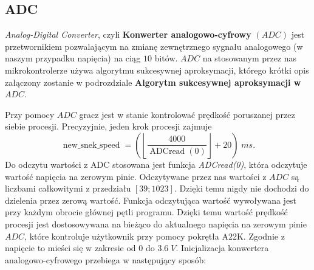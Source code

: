 \documentclass[a4paper,12pt,twoside]{article}
\theoremstyle{plain}
\theoremstyle{definition}
\theoremstyle{remark}
\begin{document}
\subsection{ADC}
\textit{Analog-Digital Converter}, czyli
\textbf{Konwerter analogowo-cyfrowy} $(ADC)$ jest przetwornikiem pozwalającym na zmianę zewnętrznego sygnału analogowego (w naszym przypadku napięcia) na ciąg $10$ bitów. $ADC$ na stosowanym przez nas mikrokontrolerze używa algorytmu sukcesywnej aproksymacji, którego krótki opis załączony zostanie w podrozdziale \textbf{Algorytm sukcesywnej aproksymacji w $ADC$}.

Przy pomocy $ADC$ gracz jest w stanie kontrolować prędkość poruszanej przez siebie procesji. Precyzyjnie, jeden krok procesji zajmuje
\[
\operatorname{new\_snek\_speed} =\left( \left\lfloor \frac{4000}{ \operatorname{ADCread}(0)} \right\rfloor + 20 \right) \; ms.
\]
Do odczytu wartości z ADC stosowana jest funkcja \textit{ADCread(0)}, która odczytuje wartość napięcia na zerowym pinie.
Odczytywane przez nas wartości z $ADC$ są liczbami całkowitymi z przedziału $[39;1023]$. Dzięki temu nigdy nie dochodzi do dzielenia przez zerową wartość. Funkcja odczytująca wartość wywoływana jest przy każdym obrocie głównej pętli programu. Dzięki temu wartość prędkość procesji jest dostosowywana na bieżąco do aktualnego napięcia na zerowym pinie $ADC$, które kontroluje użytkownik przy pomocy pokrętła A22K. Zgodnie z \cite{INST} napięcie to mieści się w zakresie od $0$ do $3.6 \;V$. 
Inicjalizacja konwertera analogowo-cyfrowego przebiega w następujący sposób:
\end{document}
